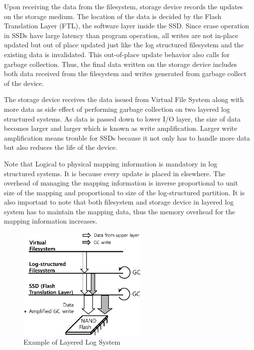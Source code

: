 \documentclass[letterpaper,twocolumn,10pt]{article}
\begin{document}
Upon receiving the data from the filesystem, storage device records the updates on the storage medium. The location of the data is decided by the Flash Translation Layer (FTL), the software layer inside the SSD. Since erase operation in SSDs have large latency than program operation, all writes are not in-place updated but out of place updated just like the log structured filesystem and the existing data is invalidated. This out-of-place update behavior also calls for garbage collection. Thus, the final data written on the storage device includes both data received from the filesystem and writes generated from garbage collect of the device.

The storage device receives the data issued from Virtual File System along with more data as side effect of performing garbage collection on two layered log structured systems. As data is passed down to lower I/O layer, the size of data becomes larger and larger which is known as write amplification. Larger write amplification means trouble for SSDs because it not only has to handle more data but also reduces the life of the device.

Note that Logical to physical mapping information is mandatory in log structured systems. It is because every update is placed in elsewhere. The overhead of managing the mapping information is inverse proportional to unit size of the mapping and proportional to size of the log-structured partition. It is also important to note that both filesystem and storage device in layered log system has to maintain the mapping data, thus the memory overhead for the mapping information increases.


\begin{figure}[h]
\begin{center}
\includegraphics[width=2.5in]{./figure/layered_log_system}
\caption{Example of Layered Log System}
\label{fig:layered_log_system}
\end{center}
\end{figure}
\end{document}
